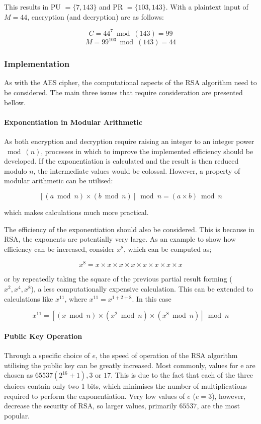 \documentclass[a4paper,10pt]{report}
\begin{document}
This results in PU $= \{7,143\}$ and PR $= \{103,143\}$. With a plaintext input of $M = 44$, encryption (and decryption) are as follows:

\[ C = 44^{7} \bmod(143) = 99 \]
\[ M = 99^{103} \bmod(143) = 44 \]

\subsubsection{Implementation}

As with the AES cipher, the computational aspects of the RSA algorithm need to be considered. The main three issues that require consideration are presented bellow.

\paragraph{Exponentiation in Modular Arithmetic}

As both encryption and decryption require raising an integer to an integer power $\bmod(n)$, processes in which to improve the implemented efficiency should be developed. If the exponentiation is calculated and the result is then reduced modulo $n$, the intermediate values would be colossal. However, a property of modular arithmetic can be utilised:

\[ [(a\bmod n)\times(b \bmod n)] \bmod n = (a \times b) \bmod n \]

which makes calculations much more practical. 

The efficiency of the exponentiation should also be considered. This is because in RSA, the exponents are potentially very large. As an example to show how efficiency can be increased, consider $x^{8}$, which can be computed as;

\[ x^{8} = x \times x \times x \times x \times x \times x \times x \times x \]

or by repeatedly taking the square of the previous partial result forming ($x^2,x^4,x^8$), a less computationally expensive calculation. This can be extended to calculations like $x^{11}$, where $x^{11} = x^{1+2+8}$. In this case

\[ x^{11} = [(x \bmod n) \times (x^2 \bmod n) \times (x^8 \bmod n)] \bmod n \]

\paragraph{Public Key Operation}

Through a specific choice of $e$, the speed of operation of the RSA algorithm utilising the public key can be greatly increased. Most commonly, values for e are chosen as $65537 (2^{16} + 1), 3$ or $17$. This is due to the fact that each of the three choices contain only two 1 bits, which minimises the number of multiplications required to perform the exponentiation. Very low values of $e$ ($e = 3$), however, decrease the security of RSA, so larger values, primarily $65537$, are the most popular. 
\end{document}
